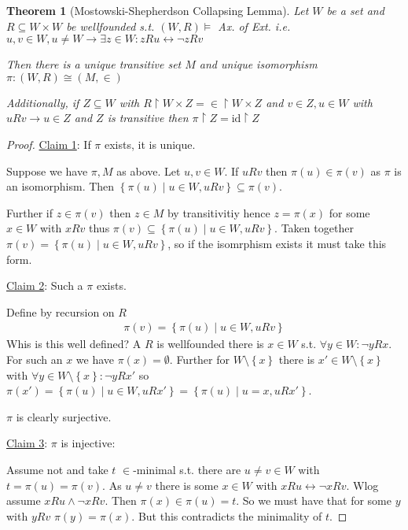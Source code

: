 \documentclass{scrartcl}
\newcommand{\set}[1]{\left\{#1\right\}}
\theoremstyle{definition}
\theoremstyle{plain}
\newtheorem*{theorem*}{Theorem}
\theoremstyle{remark}
\begin{document}
	\begin{theorem*}[Mostowski-Shepherdson Collapsing Lemma]
		Let $W$ be a set and $R \subseteq W \times W$ be wellfounded s.t. $(W, R) \vDash $ Ax. of Ext. i.e. $u, v \in W, u \neq W \longrightarrow \exists z \in W: zRu \longleftrightarrow\lnot zRv$
		
		Then there is a unique transitive set $M$ and unique isomorphism $\pi: (W, R) \cong (M, \in)$
		
		Additionally, if $Z \subseteq W$ with $R \restriction W \times Z = \in \restriction W \times Z$ and $v \in Z, u \in W$ with $uRv \longrightarrow u \in Z$ and $Z$ is transitive then $\pi\restriction Z = \text{id} \restriction Z$ 
	\end{theorem*}

	\begin{proof}
		\underline{Claim 1}: If $\pi$ exists, it is unique.
		
		Suppose we have $\pi, M$ as above. Let $u, v \in W$. If $uRv$ then $\pi(u) \in \pi(v)$ as $\pi$ is an isomorphism. Then $\set{\pi(u) \mid u \in W, uRv} \subseteq \pi(v)$.
		
		Further if $z \in \pi(v)$ then $z \in M$ by transitivitiy hence $z = \pi(x)$ for some $x \in W$ with $xRv$ thus $\pi(v) \subseteq \set{\pi(u) \mid u \in W, uRv}$. Taken together $\pi(v) = \set{\pi(u) \mid u \in W, uRv}$, so if the isomrphism exists it must take this form.
		
		\underline{Claim 2}: Such a $\pi$ exists. 
		
		Define by recursion on $R$
		\begin{align}
			\pi(v) = \set{\pi(u) \mid u \in W, uRv} \label{thmMSC1}
		\end{align}
		Whis is this well defined? A $R$ is wellfounded there is $x \in W$ s.t. $\forall y \in W: \lnot yRx$. For such an $x$ we have $\pi(x) = \emptyset$. Further
		for $W \setminus \set{x}$ there is $x' \in W \setminus \set{x}$ with $\forall y \in W\setminus \set{x}: \lnot yRx'$ so $\pi(x') = \set{\pi(u) \mid u \in W, uRx'} = \set{\pi(u)\mid u = x, uRx'}$.
		
		$\pi$ is clearly surjective.
		
		\underline{Claim 3}: $\pi$ is injective: 
		
		Assume not and take $t$ $\in$-minimal s.t. there are $u\neq v \in W$ with $t = \pi(u) = \pi(v)$. As $u \neq v$ there is some $x \in W$ with $xRu \longleftrightarrow\lnot xRv$. Wlog assume $xRu \land \lnot xRv$. Then $\pi(x) \in \pi(u) = t$. So we must have that for some $y$ with $yRv$ $\pi(y) = \pi(x)$. But this contradicts the minimality of $t$.
		

\end{proof}
\end{document}
